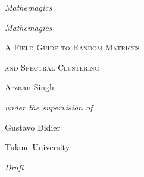 
\begin{titlepage}
  \centering
  \vspace*{4cm}
  {\LARGE\itshape Mathemagics}\par
  \vspace{14cm}
  \null
\end{titlepage}

\begin{titlepage}
  \centering
  \vspace*{2.5cm}

  {\fontsize{32}{36}\selectfont\itshape Mathemagics\par}

  \vspace{0.6cm}

  {\Large\scshape A Field Guide to Random Matrices\par}
  \vspace{0.2cm}
  {\Large\scshape and Spectral Clustering\par}

  \vfill

  {\large\rmfamily Arzaan Singh\par}
  \vspace{0.2cm}
  {\itshape under the supervision of\par}
  \vspace{0.2cm}
  {\large\rmfamily Gustavo Didier\par}

  \vspace{1cm}

  {\rmfamily Tulane University\par}

  \vspace{1cm}

  {\rmfamily\itshape Draft \DTMtoday\par}

  \vspace{2cm}
\end{titlepage}
